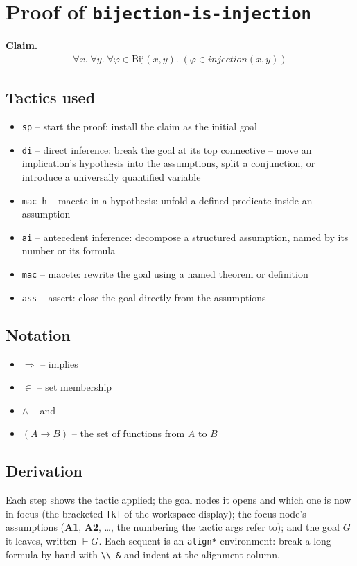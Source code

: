 \documentclass[11pt]{article}
\begin{document}
\section*{Proof of \texttt{bijection-is-injection}}
\textbf{Claim.}
\begin{align*}
  \forall x.\; \forall y.\; \forall \varphi \in \mathrm{Bij}(x, y).\; (\varphi \in \mathit{injection}(x, y))
\end{align*}
\bigskip

\subsection*{Tactics used}
\begin{itemize}
\item \texttt{sp} -- start the proof: install the claim as the initial goal
\item \texttt{di} -- direct inference: break the goal at its top connective -- move an implication's hypothesis into the assumptions, split a conjunction, or introduce a universally quantified variable
\item \texttt{mac-h} -- macete in a hypothesis: unfold a defined predicate inside an assumption
\item \texttt{ai} -- antecedent inference: decompose a structured assumption, named by its number or its formula
\item \texttt{mac} -- macete: rewrite the goal using a named theorem or definition
\item \texttt{ass} -- assert: close the goal directly from the assumptions
\end{itemize}

\subsection*{Notation}
\begin{itemize}
\item $\Rightarrow$ -- implies
\item $\in$ -- set membership
\item $\wedge$ -- and
\item $(A \to B)$ -- the set of functions from $A$ to $B$
\end{itemize}

\subsection*{Derivation}
Each step shows the tactic applied; the goal nodes it opens and which one is now in focus (the bracketed \texttt{[k]} of the workspace display); the focus node's assumptions (\textbf{A1}, \textbf{A2}, \dots{}, the numbering the tactic args refer to); and the goal $G$ it leaves, written $\vdash G$.  Each sequent is an \texttt{align*} environment: break a long formula by hand with \texttt{\textbackslash\textbackslash\ \&} and indent at the alignment column.
\end{document}

